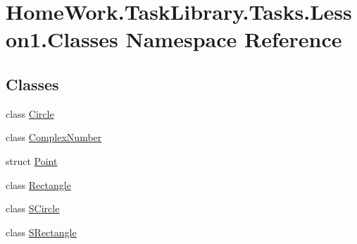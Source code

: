 \hypertarget{namespace_home_work_1_1_task_library_1_1_tasks_1_1_lesson1_1_1_classes}{}\section{Home\+Work.\+Task\+Library.\+Tasks.\+Lesson1.\+Classes Namespace Reference}
\label{namespace_home_work_1_1_task_library_1_1_tasks_1_1_lesson1_1_1_classes}
\subsection*{Classes}
\begin{DoxyCompactItemize}
\item 
class \mbox{\hyperlink{class_home_work_1_1_task_library_1_1_tasks_1_1_lesson1_1_1_classes_1_1_circle}{Circle}}
\item 
class \mbox{\hyperlink{class_home_work_1_1_task_library_1_1_tasks_1_1_lesson1_1_1_classes_1_1_complex_number}{Complex\+Number}}
\item 
struct \mbox{\hyperlink{struct_home_work_1_1_task_library_1_1_tasks_1_1_lesson1_1_1_classes_1_1_point}{Point}}
\item 
class \mbox{\hyperlink{class_home_work_1_1_task_library_1_1_tasks_1_1_lesson1_1_1_classes_1_1_rectangle}{Rectangle}}
\item 
class \mbox{\hyperlink{class_home_work_1_1_task_library_1_1_tasks_1_1_lesson1_1_1_classes_1_1_s_circle}{S\+Circle}}
\item 
class \mbox{\hyperlink{class_home_work_1_1_task_library_1_1_tasks_1_1_lesson1_1_1_classes_1_1_s_rectangle}{S\+Rectangle}}
\end{DoxyCompactItemize}
